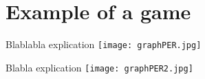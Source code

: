 \section{Example of a game}


Blablabla explication
\texttt{[image: graphPER.jpg]}

Blabla explication
\texttt{[image: graphPER2.jpg]}